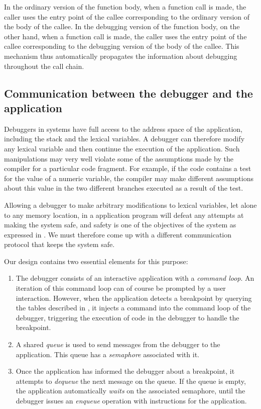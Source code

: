 In the ordinary version of the function body, when a function call is
made, the caller uses the entry point of the callee corresponding to
the ordinary version of the body of the callee.  In the debugging
version of the function body, on the other hand, when a function call
is made, the caller uses the entry point of the callee corresponding
to the debugging version of the body of the callee.  This mechanism
thus automatically propagates the information about debugging
throughout the call chain.

\subsection{Communication between the debugger and the application}
\label{sec-debugger-application-communication}

Debuggers in \unix{} systems have full access to the address space of
the application, including the stack and the lexical variables.  A
\unix{} debugger can therefore modify any lexical variable and then
continue the execution of the application.  Such manipulations may
very well violate some of the assumptions made by the compiler for a
particular code fragment.  For example, if the code contains a test
for the value of a numeric variable, the compiler may make different
assumptions about this value in the two different branches executed as
a result of the test.

Allowing a debugger to make arbitrary modifications to lexical
variables, let alone to any memory location, in a \commonlisp{}
application program will defeat any attempts at making the system
safe, and safety is one of the objectives of the \sicl{} system as
expressed in .  We must therefore come up
with a different communication protocol that keeps the system safe.

Our design contains two essential elements for this purpose:

\begin{enumerate}
\item The debugger consists of an interactive application with a
  \emph{command loop}.  An iteration of this command loop can of
  course be prompted by a user interaction.  However, when the
  application detects a breakpoint by querying the tables described in
  , it injects a command into the
  command loop of the debugger, triggering the execution of code in
  the debugger to handle the breakpoint.
\item A shared \emph{queue} is used to send messages from the debugger
  to the application.  This queue has a \emph{semaphore} associated
  with it.
\item Once the application has informed the debugger about a
  breakpoint, it attempts to \emph{dequeue} the next message on the
  queue.  If the queue is empty, the application automatically
  \emph{waits} on the associated semaphore, until the debugger issues
  an \emph{enqueue} operation with instructions for the application.
\end{enumerate}

